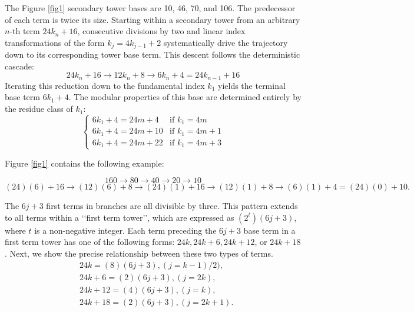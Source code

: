 \documentclass[sn-mathphys-num, pdflatex]{sn-jnl}
\begin{document}
The Figure \ref{fig1} secondary tower bases are 10, 46, 70, and 106. The predecessor of each term is twice its size. Starting within a secondary tower from an arbitrary $n$-th term $24k_n+16$, consecutive divisions by two and linear index transformations of the form $k_j = 4k_{j-1}+2$ systematically drive the trajectory down to its corresponding tower base term. This descent follows the deterministic cascade:
\begin{equation*}
24k_n+16 \longrightarrow 12k_n+8 \longrightarrow 6k_n+4 = 24k_{n-1}+16
\end{equation*}
Iterating this reduction down to the fundamental index $k_1$ yields the terminal base term $6k_1+4$. The modular properties of this base are determined entirely by the residue class of $k_1$:
$$
\begin{cases} 
6k_1+4 = 24m+4 & \text{if } k_1 = 4m \\ 
6k_1+4 = 24m+10 & \text{if } k_1 = 4m+1 \\ 
6k_1+4 = 24m+22 & \text{if } k_1 = 4m+3 
\end{cases}
$$

\begin{center} Figure \ref{fig1} contains the following example: 
 \end{center}
 $$160 \to 80 \to 40 \to 20 \to 10$$  
 $$(24)(6)+16 \to (12)(6)+8  \to (24)(1)+16  \to (12)(1)+8 \to (6)(1)+4 = (24)(0)+10.$$

 The $6j+3$ first terms in branches are all divisible by three. This pattern extends to all terms within a \lq\lq first term tower\rq\rq, which are expressed as $(2^t)(6j+3)$, where $t$ is a non-negative integer. Each term preceding the $6j+3$ base term in a first term tower has one of the following forms: $24k, 24k+6, 24k+12$, or $24k+18$. Next, we show the precise relationship between these two types of terms.  
$$ \begin{array}{ll} 
        &24k = (8)(6j+3), (j=k-1)/2), \\ 
        &24k+6 = (2)(6j+3), (j=2k), \\
        &24k+12=(4)(6j+3), (j=k), \\
        &24k+18=(2)(6j+3), (j=2k+1).\end{array}$$
\end{document}
